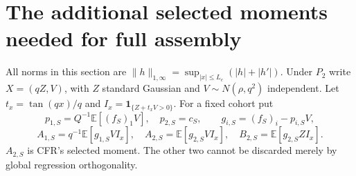 \documentclass[11pt]{article}
\theoremstyle{remark}\newtheorem{remark}[theorem]{Remark}
\newcommand{\E}{\mathbb E}
\newcommand{\one}{\mathbf1}
\begin{document}
\section{The additional selected moments needed for full assembly}
All norms in this section are
$\|h\|_{1,\infty}=\sup_{|x|\le L_c}(|h|+|h'|)$.
Under $P_2$ write $X=(qZ,V)$, with $Z$ standard Gaussian and
$V\sim N(\rho,q^2)$ independent. Let
$t_x=\tan(qx)/q$ and $I_x=\one_{\{Z+t_xV>0\}}$.
For a fixed cohort put
\[
 p_{1,S}=Q^{-1}\E[(f_S)_1V],\quad p_{2,S}=c_S,\qquad
 g_{i,S}=(f_S)_i-p_{i,S}V,
\]
\begin{equation}
 A_{1,S}=q^{-1}\E[g_{1,S}VI_x],\quad
 A_{2,S}=\E[g_{2,S}VI_x],\quad
 B_{2,S}=\E[g_{2,S}ZI_x].
 \label{an03cfav1:selecteddefs}
\end{equation}
$A_{2,S}$ is CFR's selected moment. The other two cannot be
discarded merely by global regression orthogonality.
\end{document}
